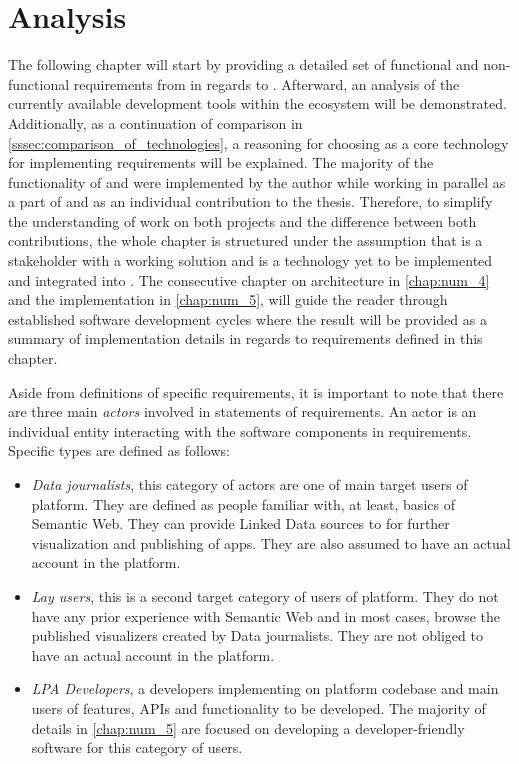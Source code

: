 \chapter{Analysis}
\label{chap:num_3}

The following chapter will start by providing a detailed set of functional and non-functional requirements from \lpa{} in regards to \lpas{}. Afterward, an analysis of the currently available development tools within the \solid{} ecosystem will be demonstrated. Additionally, as a continuation of comparison in \autoref{sssec:comparison_of_technologies}, a reasoning for choosing \solid{} as a core technology for implementing \lpa{} requirements will be explained.  The majority of the functionality of \lpa{} and \lpas{} were implemented by the author while working in parallel as a part of \lpa{} and as an individual contribution to the thesis. Therefore, to simplify the understanding of work on both projects and the difference between both contributions, the whole chapter is structured under the assumption that \lpa{} is a stakeholder with a working solution and \lpas{} is a technology yet to be implemented and integrated into \lpa{}. The consecutive chapter on architecture in \autoref{chap:num_4} and the implementation in \autoref{chap:num_5}, will guide the reader through established software development cycles where the result will be provided as a summary of implementation details in regards to requirements defined in this chapter.

Aside from definitions of specific requirements, it is important to note that there are three main \textit{actors} involved in statements of requirements. An actor is an individual entity interacting with the software components in requirements. Specific types are defined as follows:
\begin{itemize}
    \item \textit{Data journalists}, this category of actors are one of main target users of \lpa{} platform. They are defined as people familiar with, at least, basics of Semantic Web. They can provide Linked  Data sources to \lpa{} for further visualization and publishing of apps. They are also assumed to have an actual account in the \lpa{} platform.
    \item \textit{Lay users}, this is a second target category of users of \lpa{} platform. They do not have any prior experience with Semantic Web and in most cases, browse the published visualizers created by Data journalists. They are not obliged to have an actual account in the \lpa{} platform.
    \item \textit{LPA Developers}, a developers implementing on \lpa{} platform codebase and main users of \lpas{} features, APIs and functionality to be developed. The majority of details in \autoref{chap:num_5} are focused on developing a developer-friendly software for this category of users.
\end{itemize}

